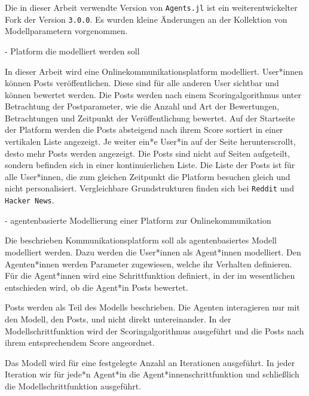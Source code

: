 Die in dieser Arbeit verwendte Version von \texttt{Agents.jl} ist ein weiterentwickelter Fork der Version \texttt{3.0.0}. Es wurden kleine Änderungen an der Kollektion von Modellparametern vorgenommen.

- Platform die modelliert werden soll

In dieser Arbeit wird eine Onlinekommunikationsplatform modelliert. User*innen können Posts veröffentlichen. Diese sind für alle anderen User sichtbar und können bewertet werden. Die Posts werden nach einem Scoringalgorithmus unter Betrachtung der Postparameter, wie die Anzahl und Art der Bewertungen, Betrachtungen und Zeitpunkt der Veröffentlichung bewertet. Auf der Startseite der Platform werden die Posts absteigend nach ihrem Score sortiert in einer vertikalen Liste angezeigt. Je weiter ein*e User*in auf der Seite herunterscrollt, desto mehr Posts werden angezeigt. Die Posts sind nicht auf Seiten aufgeteilt, sondern befinden sich in einer kontinuierlichen Liste. Die Liste der Posts ist für alle User*innen, die zum gleichen Zeitpunkt die Platform besuchen gleich und nicht personalisiert. Vergleichbare Grundstrukturen finden sich bei \texttt{Reddit} und \texttt{Hacker News}.



- agentenbasierte Modellierung einer Platform zur Onlinekommunikation

Die beschrieben Kommunikationsplatform soll als agentenbasiertes Modell modelliert werden. Dazu werden die User*innen als Agent*innen modelliert.
Den Agenten*innen werden Parameter zugewiesen, welche ihr Verhalten definieren.
Für die Agent*innen wird eine Schrittfunktion definiert, in der im wesentlichen entschieden wird, ob die Agent*in Posts bewertet.

Posts werden als Teil des Modells beschrieben. Die Agenten interagieren nur mit den Modell, den Posts, und nicht direkt untereinander.
In der Modellschrittfunktion wird der Scoringalgorithmus ausgeführt und die Posts nach ihrem entsprechendem Score angeordnet.

Das Modell wird für eine festgelegte Anzahl an Iterationen ausgeführt. In jeder Iteration wir für jede*n Agent*in die Agent*innenschrittfunktion und schließlich die Modellschrittfunktion ausgeführt.







